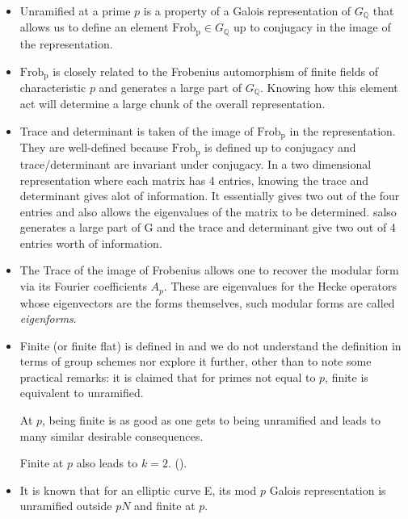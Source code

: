\documentclass{article}
\theoremstyle{definition}
\theoremstyle{definition}
\theoremstyle{definition}
\newcommand{\Frp}{\operatorname{Frob_{p}}}
\newcommand{\Q}{\mathbb{Q}}
\begin{document}
\begin{itemize}
    \item Unramified at a prime $p$ is a property of a Galois representation of $G_\Q$ that allows us to define an element $\Frp\in G_\Q$ up to conjugacy in the image of the representation.
\item 
$\Frp$ is closely related to the Frobenius automorphism of finite fields of characteristic $p$ and generates a large part of $G_\Q$. Knowing how this element act will determine a large chunk of the overall representation.
\item Trace and determinant is taken of the image of $\Frp$ in the representation. They are well-defined because $\Frp$ is defined up to conjugacy and trace/determinant are invariant under conjugacy. In a two dimensional representation where each matrix has 4 entries, knowing the trace and determinant gives alot of information. It essentially gives two out of the four entries and also allows the eigenvalues of the matrix to be determined.
salso generates a large part of G and the trace and determinant give two out of 4 entries worth of information.

\item The Trace of the image of Frobenius allows one to recover the modular form via its Fourier coefficients $A_p$. These are eigenvalues for the Hecke operators whose eigenvectors are the forms themselves, such modular forms are called \emph{eigenforms}.


\item Finite (or finite flat) is defined in \cite{Serre} and we do not understand the definition in terms of group schemes nor explore it further, other than to note some practical remarks: it is claimed that for primes not equal to $p$, finite is equivalent to unramified.

At $p$, being finite is as good as one gets to being unramified and leads to many similar desirable consequences.

Finite at $p$ also leads to $k=2$. (\cite{Serre}).

\item It is known that for an elliptic curve E, its
mod $p$ Galois representation is unramified outside $pN$ and finite at $p$.

\end{itemize}
\end{document}
